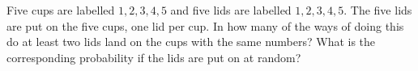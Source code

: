 Five cups are labelled $1,2,3,4,5$ and five lids are labelled $1,2,3,4,5$. The five lids are put on the five cups, one lid per cup. In how many of the ways of doing this do at least two lids land on the cups with the same numbers? What is the corresponding probability if the lids are put on at random?
